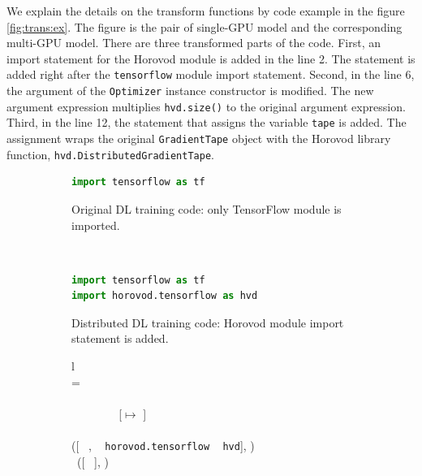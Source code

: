 We explain the details on the transform functions by code example in
the figure \ref{fig:trans:ex}. The figure is the pair of single-GPU model
and the corresponding multi-GPU model.
There are three transformed parts of the code. 
First, an import statement for the Horovod module is added in the line 2. 
The statement is added right after the {\tt tensorflow} module import statement.
Second, in the line 6, the argument of the {\tt Optimizer} instance constructor
is modified. The new argument expression multiplies {\tt hvd.size()} 
to the original argument expression.
Third, in the line 12, the statement that assigns the variable {\tt tape}
is added. The assignment wraps the original {\tt GradientTape} object with
the Horovod library function, {\tt hvd.DistributedGradientTape}.

\begin{figure}[ht!]
    \centering
    \begin{subfigure}[b]{0.48\textwidth}
        \begin{lstlisting}[language=Python]
import tensorflow as tf\end{lstlisting}
        \caption{Original DL training code: only TensorFlow module is imported.}
        \label{fig:trans:ex01:org}
    \end{subfigure}
    ~
    \begin{subfigure}[b]{0.48\textwidth}
        \begin{lstlisting}[language=Python]
import tensorflow as tf
import horovod.tensorflow as hvd\end{lstlisting}
        \caption{Distributed DL training code: Horovod module import statement is added.}
        \label{fig:trans:ex01:hvd}
    \end{subfigure}
    \begin{subfigure}[t]{\textwidth}
        \centering
        \begin{tabular}{l}
            \\
            \tstmt{\kimport ~ \mul{\nalias}}{\smodenv} = \\
            \inden \ktlet ~  ~ \kteq ~ \taalias{\mul{\nalias}}{\smodenv} \ktin \\
            \inden \ktif ~  ~ \envsub ~ \smodenv ~ \kteq ~ [\tflow $\mapsto$ \nid]\\ 
            \inden\ktthen \\
            \inden\hspace{1em} ([\kimport ~ \mul{\nalias},
            \kimport ~ {\tt horovod.tensorflow} \kas ~ {\tt hvd}], )\\
            \inden \ktelse~([\kimport ~ \mul{\nalias}], )
\end{tabular}\\\vpar


\end{subfigure}
\end{figure}
